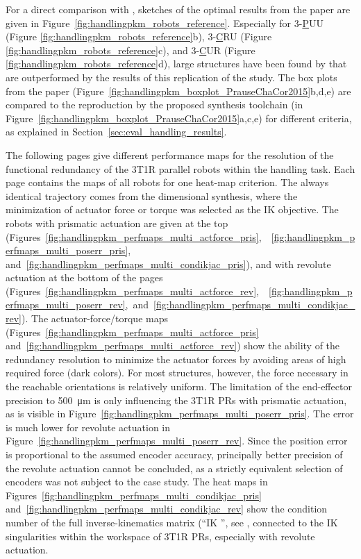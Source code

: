 For a direct comparison with \cite{PrauseChaCor2015}, sketches of the optimal results from the paper are given in Figure~\ref{fig:handlingpkm_robots_reference}.
Especially for 3-\underline{P}UU (Figure \ref{fig:handlingpkm_robots_reference}b), 3-\underline{C}RU (Figure \ref{fig:handlingpkm_robots_reference}c), and 3-\underline{C}UR (Figure \ref{fig:handlingpkm_robots_reference}d), large structures have been found by \cite{PrauseChaCor2015} that are outperformed by the results of this replication of the study.
%
The box plots from the paper (Figure~\ref{fig:handlingpkm_boxplot_PrauseChaCor2015}b,d,e) are compared to the reproduction by the proposed synthesis toolchain (in Figure~\ref{fig:handlingpkm_boxplot_PrauseChaCor2015}a,c,e) for different criteria, as explained in Section~\ref{sec:eval_handling_results}.

%
The following pages give different performance maps for the resolution of the functional redundancy of the 3T1R parallel robots within the handling task.
Each page contains the maps of all robots for one heat-map criterion.
The always identical trajectory comes from the dimensional synthesis, where the minimization of actuator force or torque was selected as the IK objective. %
The robots with prismatic actuation are given at the top \mbox{(Figures~\ref{fig:handlingpkm_perfmaps_multi_actforce_pris}, ~\ref{fig:handlingpkm_perfmaps_multi_poserr_pris}}, and~\ref{fig:handlingpkm_perfmaps_multi_condikjac_pris}), and with revolute actuation at the bottom of the pages \mbox{(Figures~\ref{fig:handlingpkm_perfmaps_multi_actforce_rev}, ~\ref{fig:handlingpkm_perfmaps_multi_poserr_rev}, and~\ref{fig:handlingpkm_perfmaps_multi_condikjac_rev})}.
The actuator-force/torque maps (Figures~\ref{fig:handlingpkm_perfmaps_multi_actforce_pris} and~\ref{fig:handlingpkm_perfmaps_multi_actforce_rev}) show the ability of the redundancy resolution to minimize the actuator forces by avoiding areas of high required force (dark colors). %
For most structures, however, the force necessary in the reachable orientations is relatively uniform.
The limitation of the end-effector precision to \SI{500}{\micro\metre} %
is only influencing the 3T1R PRs with prismatic actuation, as is visible in Figure~\ref{fig:handlingpkm_perfmaps_multi_poserr_pris}.
The error is much lower for revolute actuation in Figure~\ref{fig:handlingpkm_perfmaps_multi_poserr_rev}. %
Since the position error is proportional to the assumed encoder accuracy, principally better precision of the revolute actuation cannot be concluded, as a strictly equivalent selection of encoders was not subject to the case study. %
The heat maps in Figures~\ref{fig:handlingpkm_perfmaps_multi_condikjac_pris} and~\ref{fig:handlingpkm_perfmaps_multi_condikjac_rev} show the condition number of the full inverse-kinematics matrix (``IK '', see \cite{SchapplerTapOrt2019c}, connected to the IK singularities within the workspace of 3T1R PRs, especially with revolute actuation. %
%
%

